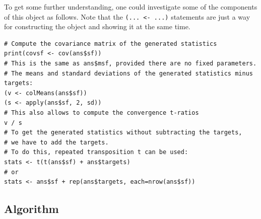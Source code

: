 \documentclass[a4paper,fleqn,11pt]{article}
\newcommand{\+}{\, + \,}
\begin{document}
To get some further understanding, one could investigate some of the components
of this object as follows.
Note that the \texttt{(... <- ...)} statements are just a way for
constructing the object and showing it at the same time.
\begin{verbatim}
# Compute the covariance matrix of the generated statistics
print(covsf <- cov(ans$sf))
# This is the same as ans$msf, provided there are no fixed parameters.
# The means and standard deviations of the generated statistics minus targets:
(v <- colMeans(ans$sf))
(s <- apply(ans$sf, 2, sd))
# This also allows to compute the convergence t-ratios
v / s
# To get the generated statistics without subtracting the targets,
# we have to add the targets.
# To do this, repeated transposition t can be used:
stats <- t(t(ans$sf) + ans$targets)
# or
stats <- ans$sf + rep(ans$targets, each=nrow(ans$sf))
\end{verbatim}



\subsection{Algorithm}
\label{S_algorithm}
\end{document}
